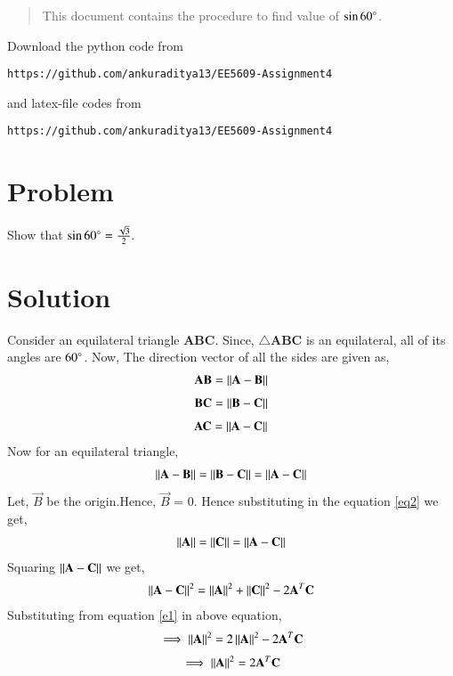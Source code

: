 \documentclass[journal,12pt,twocolumn]{IEEEtran}
\begin{document}
\begin{abstract}
This document contains the procedure to find value of $\sin60\degree$.
\end{abstract}
Download the python code from 
\begin{lstlisting}
https://github.com/ankuraditya13/EE5609-Assignment4
\end{lstlisting}
%
and latex-file codes from 
%
\begin{lstlisting}
https://github.com/ankuraditya13/EE5609-Assignment4
\end{lstlisting}

\section{Problem}
Show that $\sin60\degree = \frac{\sqrt{3}}{2}.$
\section{Solution}
Consider an equilateral triangle \textbf{ABC}. Since, $\triangle$\textbf{ABC} is an equilateral, all of its angles are $60\degree$. Now, The direction vector of all the sides are given as,
\begin{align}
\mathbf{AB}=\left\lVert\mathbf{A-B}\right\rVert
\end{align}
\begin{align}
\mathbf{BC}=\left\lVert\mathbf{B-C}\right\rVert
\end{align}  
\begin{align}
\mathbf{AC}=\left\lVert\mathbf{A-C}\right\rVert
\end{align} 
Now for an equilateral triangle,
\begin{align}
\left\lVert\mathbf{A-B}\right\rVert = \left\lVert\mathbf{B-C}\right\rVert = \left\lVert\mathbf{A-C}\right\rVert
\label{eq2}
\end{align}
Let, $\vec{B}$ be the origin.Hence, $\vec{B}$ = 0. Hence substituting in the equation \eqref{eq2} we get,
\begin{align}
\left\lVert\mathbf{A}\right\rVert = \left\lVert\mathbf{C}\right\rVert =\left\lVert\mathbf{A}-\mathbf{C}\right\rVert
\label{e1}
\end{align}
Squaring $\left\lVert\mathbf{A}-\mathbf{C}\right\rVert$ we get,
\begin{align}
\left\lVert\mathbf{A}-\mathbf{C}\right\rVert^2 = \left\lVert\mathbf{A}\right\rVert^2+\left\lVert\mathbf{C}\right\rVert^2-2\mathbf{A}^T\mathbf{C}
\end{align} 
Substituting from equation \eqref{e1} in above equation, 
\begin{align}
\implies \left\lVert\mathbf{A}\right\rVert^2 = 2\left\lVert\mathbf{A}\right\rVert^2-2\mathbf{A}^T\mathbf{C}
\end{align}
\begin{align}
\implies \left\lVert\mathbf{A}\right\rVert^2 = 2\mathbf{A}^T\mathbf{C}
\label{eq4}
\end{align}
\end{document}
